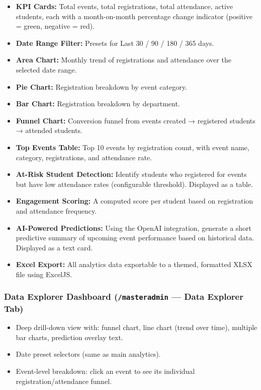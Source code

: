 \documentclass[12pt,a4paper]{article}
\begin{document}
\begin{itemize}[leftmargin=*]
    \item \textbf{KPI Cards:} Total events, total registrations, total attendance, active students, each with a month-on-month percentage change indicator (positive = green, negative = red).
    \item \textbf{Date Range Filter:} Presets for Last 30 / 90 / 180 / 365 days.
    \item \textbf{Area Chart:} Monthly trend of registrations and attendance over the selected date range.
    \item \textbf{Pie Chart:} Registration breakdown by event category.
    \item \textbf{Bar Chart:} Registration breakdown by department.
    \item \textbf{Funnel Chart:} Conversion funnel from events created → registered students → attended students.
    \item \textbf{Top Events Table:} Top 10 events by registration count, with event name, category, registrations, and attendance rate.
    \item \textbf{At-Risk Student Detection:} Identify students who registered for events but have low attendance rates (configurable threshold). Displayed as a table.
    \item \textbf{Engagement Scoring:} A computed score per student based on registration and attendance frequency.
    \item \textbf{AI-Powered Predictions:} Using the OpenAI integration, generate a short predictive summary of upcoming event performance based on historical data. Displayed as a text card.
    \item \textbf{Excel Export:} All analytics data exportable to a themed, formatted XLSX file using ExcelJS.
\end{itemize}

\subsubsection{Data Explorer Dashboard (\texttt{/masteradmin} — Data Explorer Tab)}

\begin{itemize}[leftmargin=*]
    \item Deep drill-down view with: funnel chart, line chart (trend over time), multiple bar charts, prediction overlay text.
    \item Date preset selectors (same as main analytics).
    \item Event-level breakdown: click an event to see its individual registration/attendance funnel.
\end{itemize}
\end{document}
